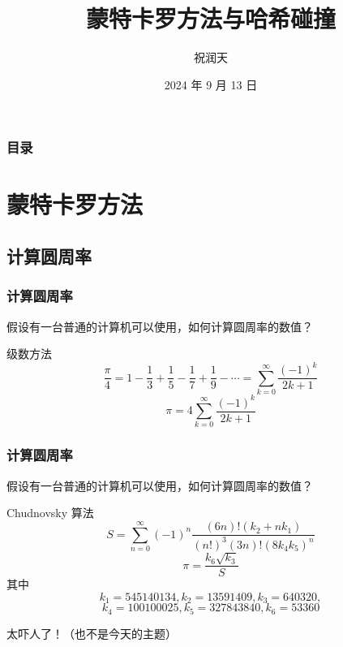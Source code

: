 \documentclass{beamer}
\title{蒙特卡罗方法与哈希碰撞}
\author{祝润天}
\institute{复旦大学计算机科学技术学院}
\date{2024 年 9 月 13 日}
\begin{document}
\begin{frame}
    
    \maketitle

\end{frame}

\begin{frame}
    \frametitle{目录}

    \tableofcontents

\end{frame}

\section{蒙特卡罗方法}

\subsection{计算圆周率}

\begin{frame}
    \frametitle{计算圆周率}

    \begin{problem}
        假设有一台普通的计算机可以使用，如何计算圆周率的数值？       
    \end{problem}

    \pause

    \begin{block}{级数方法}
        $$\frac{\pi}{4} = 1 - \frac{1}{3} + \frac{1}{5} - \frac{1}{7} + \frac{1}{9} - \cdots = \sum_{k = 0}^{\infty} \frac{(-1)^k}{2k + 1}$$
        $$\pi = 4\sum_{k = 0}^{\infty} \frac{(-1)^k}{2k + 1}$$
    \end{block}

\end{frame}

\begin{frame}
    \frametitle{计算圆周率}

    \begin{problem}
        假设有一台普通的计算机可以使用，如何计算圆周率的数值？       
    \end{problem}

    \begin{block}{Chudnovsky 算法}
        $$S = \sum_{n = 0}^{\infty} (-1)^n \frac{(6n)!(k_2+nk_1)}{(n!)^3(3n)!(8k_4k_5)^n}$$
        $$\pi = \frac{k_6\sqrt{k_3}}{S}$$
        其中
        $$k_1 = 545140134, k_2 = 13591409, k_3 = 640320,$$
        $$k_4 = 100100025, k_5 = 327843840, k_6 = 53360$$
    \end{block}
    太吓人了！（也不是今天的主题）

\end{frame}
\end{document}
